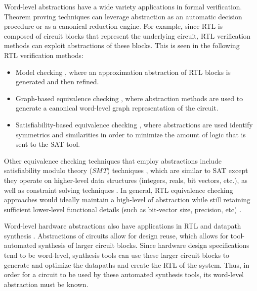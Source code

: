 Word-level abstractions have a wide variety applications in formal 
verification. Theorem proving techniques can leverage abstraction as an 
automatic decision procedure or as a canonical reduction 
engine. For example, since RTL is composed of circuit blocks that represent 
the underlying circuit, RTL verification methods can exploit 
abstractions of these blocks.
This is seen in the following RTL verification methods:
\begin{itemize}  
\item Model checking \cite{kroening:model}, 
where an approximation abstraction of RTL blocks is generated and then 
refined.
\item Graph-based equivalence 
checking \cite{WLS} \cite{arditi:bmd}, where abstraction methods are used
to generate a canonical word-level graph representation of the circuit.
\item Satisfiability-based equivalence checking \cite{lpsat}, where 
abstractions are used identify symmetrics and similarities in order to 
minimize the amount of logic that is sent to the 
SAT tool. 
\end{itemize}

Other equivalence checking techniques that employ abstractions 
include satisfiability modulo theory ({\it SMT}) techniques \cite{boolector} \cite{bryant:tacas07}, 
which are similar to SAT except they operate on higher-level data
structures (integers, reals, bit vectors, etc.), as well as 
constraint solving techniques \cite {ms:research} \cite{tew:iccad08}.
In general, RTL equivalence checking approaches would ideally maintain a 
high-level of abstraction while still retaining sufficient lower-level 
functional details  (such as bit-vector size, precision, etc) 
\cite{gupta_survey}.

Word-level hardware abstractions also have applications in RTL and datapath 
synthesis \cite{demicheli:iccad_98} \cite{demicheli:dac_99}
\cite{demicheli:tcad_03}. 
Abstractions of circuits allow for design reuse, which allows for tool-automated 
synthesis of larger circuit blocks.
Since hardware design specifications tend to be word-level, synthesis tools 
can use these larger circuit blocks to generate and optimize the
datapaths and create the RTL of the system. Thus, in order for a circuit to 
be used by these automated synthesis tools, its word-level abstraction must
be known.

